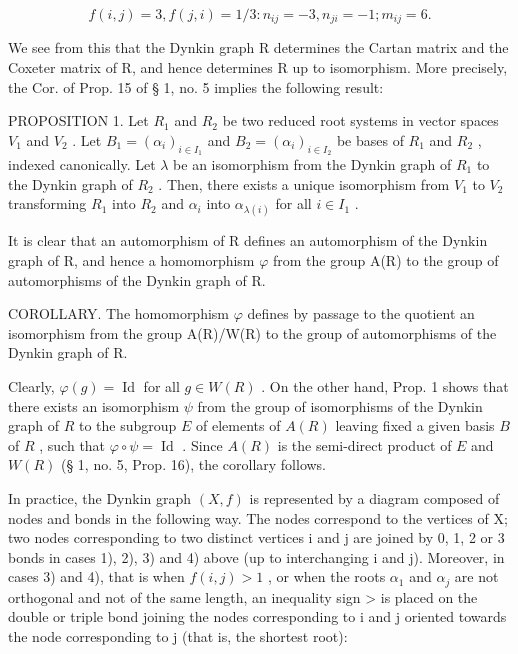 \[
f (i, j) = 3, f (j, i) = 1 / 3: n _ {i j} = - 3, n _ {j i} = - 1; m _ {i j} = 6.
\]

We see from this that the Dynkin graph R determines the Cartan matrix and the Coxeter matrix of R, and hence determines R up to isomorphism. More precisely, the Cor. of Prop. 15 of § 1, no. 5 implies the following result:

PROPOSITION 1. Let \(R_{1}\) and \(R_{2}\) be two reduced root systems in vector spaces \(V_{1}\) and \(V_{2}\) . Let \(B_{1} = (\alpha_{i})_{i \in I_{1}}\) and \(B_{2} = (\alpha_{i})_{i \in I_{2}}\) be bases of \(R_{1}\) and \(R_{2}\) , indexed canonically. Let \(\lambda\) be an isomorphism from the Dynkin graph of \(R_{1}\) to the Dynkin graph of \(R_{2}\) . Then, there exists a unique isomorphism from \(V_{1}\) to \(V_{2}\) transforming \(R_{1}\) into \(R_{2}\) and \(\alpha_{i}\) into \(\alpha_{\lambda(i)}\) for all \(i \in I_{1}\) .

It is clear that an automorphism of R defines an automorphism of the Dynkin graph of R, and hence a homomorphism \(\varphi\) from the group A(R) to the group of automorphisms of the Dynkin graph of R.

COROLLARY. The homomorphism \(\varphi\) defines by passage to the quotient an isomorphism from the group A(R)/W(R) to the group of automorphisms of the Dynkin graph of R.

Clearly, \(\varphi(g) = \operatorname{Id}\) for all \(g \in W(R)\) . On the other hand, Prop. 1 shows that there exists an isomorphism \(\psi\) from the group of isomorphisms of the Dynkin graph of \(R\) to the subgroup \(E\) of elements of \(A(R)\) leaving fixed a given basis \(B\) of \(R\) , such that \(\varphi \circ \psi = \operatorname{Id}\) . Since \(A(R)\) is the semi-direct product of \(E\) and \(W(R)\) (§ 1, no. 5, Prop. 16), the corollary follows.

In practice, the Dynkin graph \((X, f)\) is represented by a diagram composed of nodes and bonds in the following way. The nodes correspond to the vertices of X; two nodes corresponding to two distinct vertices i and j are joined by 0, 1, 2 or 3 bonds in cases 1), 2), 3) and 4) above (up to interchanging i and j). Moreover, in cases 3) and 4), that is when \(f(i, j) > 1\) , or when the roots \(\alpha_{1}\) and \(\alpha_{j}\) are not orthogonal and not of the same length, an inequality sign \textgreater{} is placed on the double or triple bond joining the nodes corresponding to i and j oriented towards the node corresponding to j (that is, the shortest root):

